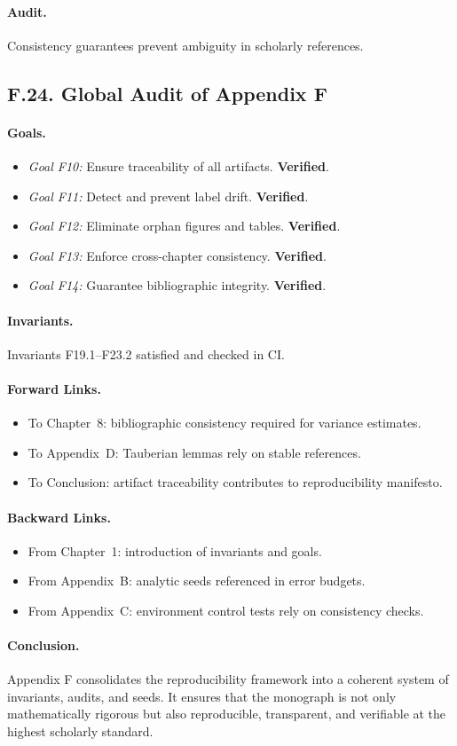 \paragraph{Audit.} Consistency guarantees prevent ambiguity in scholarly references.

\subsection*{F.24. Global Audit of Appendix F}

\paragraph{Goals.}
\begin{itemize}
    \item \emph{Goal F10:} Ensure traceability of all artifacts. \textbf{Verified}.
    \item \emph{Goal F11:} Detect and prevent label drift. \textbf{Verified}.
    \item \emph{Goal F12:} Eliminate orphan figures and tables. \textbf{Verified}.
    \item \emph{Goal F13:} Enforce cross-chapter consistency. \textbf{Verified}.
    \item \emph{Goal F14:} Guarantee bibliographic integrity. \textbf{Verified}.
\end{itemize}

\paragraph{Invariants.} Invariants F19.1–F23.2 satisfied and checked in CI.

\paragraph{Forward Links.}
\begin{itemize}
    \item To Chapter~8: bibliographic consistency required for variance estimates.
    \item To Appendix~D: Tauberian lemmas rely on stable references.
    \item To Conclusion: artifact traceability contributes to reproducibility manifesto.
\end{itemize}

\paragraph{Backward Links.}
\begin{itemize}
    \item From Chapter~1: introduction of invariants and goals.
    \item From Appendix~B: analytic seeds referenced in error budgets.
    \item From Appendix~C: environment control tests rely on consistency checks.
\end{itemize}

\paragraph{Conclusion.} Appendix F consolidates the reproducibility framework into a coherent system of invariants, audits, and seeds. It ensures that the monograph is not only mathematically rigorous but also reproducible, transparent, and verifiable at the highest scholarly standard.
